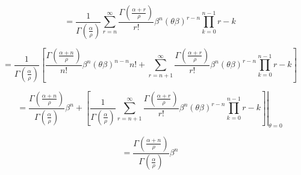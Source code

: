 \begin{frame}
    \begin{equation*}
        = \frac{1}{{\Gamma \left ( \frac{\alpha}{\rho} \right)}} \sum_{r=n}^{\infty} \frac{\Gamma \left (\frac{\alpha+r}{\rho} \right)}{r!}
          \beta^{n} (\theta \beta)^{r-n} \prod_{k=0}^{n-1} r-k
    \end{equation*}

    \begin{equation*}
        = \frac{1}{{\Gamma \left ( \frac{\alpha}{\rho} \right)}} \left
          [ \frac{\Gamma \left (\frac{\alpha+n}{\rho} \right)}{n!} \beta^n (\theta \beta)^{n-n} n! +
            \sum_{r=n+1}^{\infty} \frac{\Gamma \left (\frac{\alpha+r}{\rho} \right)}{r!} \beta^{n} (\theta \beta)^{r-n} \prod_{k=0}^{n-1} r-k \right ]
    \end{equation*}

    \begin{equation*}
        = \frac{\Gamma \left (\frac{\alpha+n}{\rho} \right)}{{\Gamma \left ( \frac{\alpha}{\rho} \right)}} \beta^n +
        \left.\left[ \frac{1}{{\Gamma \left ( \frac{\alpha}{\rho} \right)}}
            \sum_{r=n+1}^{\infty} \frac{\Gamma \left (\frac{\alpha+r}{\rho} \right)}{r!} \beta^{n} (\theta \beta)^{r-n} \prod_{k=0}^{n-1} r-k
        \right ] \right \vert_{\theta = 0}
    \end{equation*}

    \begin{equation*}
        = \frac{\Gamma \left (\frac{\alpha+n}{\rho} \right)}{{\Gamma \left ( \frac{\alpha}{\rho} \right)}} \beta^n
    \end{equation*}
\end{frame}
